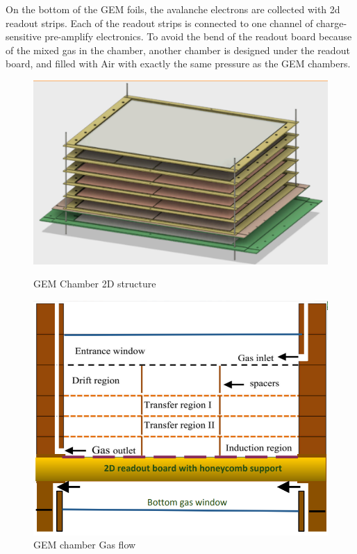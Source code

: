 On the bottom of the GEM foils, the avalanche electrons are collected with 2d readout strips. Each of the readout strips is connected to one channel of charge-sensitive pre-amplify electronics. To avoid the bend of the readout board because of the mixed gas in the chamber, another chamber is designed under the readout board, and filled with Air with exactly the same pressure as the GEM chambers. 

\begin{figure}[!tbp]
  \centering
  \begin{minipage}[b]{0.45\textwidth}
    \includegraphics[width=\textwidth]{images/chap5/gem_structure_3d.png}
    \caption{GEM Chamber 2D structure}
  \end{minipage}
  \hfill
  \begin{minipage}[b]{0.45\textwidth}
    \includegraphics[width=\textwidth]{images/chap5/gem_structure_chamber_2d.png}
    \caption{GEM chamber Gas flow}
  \end{minipage}
\end{figure}

